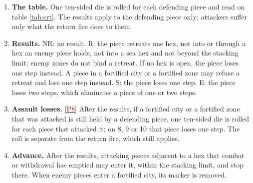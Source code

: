 \documentclass[11pt]{article}
\newcommand{\ptest}[1]{\hyperlink{ptest}{\textcolor{darkred}{[P#1]}}}
\begin{document}
\begin{enumerate}
\begin{eqnarray}
R &=& \left\lfloor A/D \right\rfloor \mbox{\quad giving odds } R{:}1, \mbox{ when } A \ge D, \label{eq:odds_A}\\
R &=& \left\lceil D/A \right\rceil \mbox{\quad giving odds } 1{:}R, \mbox{ when } A < D. \label{eq:odds_B}
\end{eqnarray}
HexKrieg rounds both ratios up from three quarters,
\begin{eqnarray}
R &=& \left\lfloor \tfrac{1}{4}+A/D \right\rfloor \mbox{\quad when } A \ge D, \label{eq:hkodds_A}\\
R &=& \left\lfloor \tfrac{1}{4}+D/A \right\rfloor \mbox{\quad when } A < D, \label{eq:hkodds_B}
\end{eqnarray}
so that by equation \eqref{eq:hkodds_B} an attack of 2 on a defense of 3 counts as 1:1; by equation \eqref{eq:odds_B} it counts as 1:2.
\item \textbf{The table.} One ten-sided die is rolled for each defending piece and read on table \ref{tab:crt}. The results apply to the defending piece only; attackers suffer only what the return fire does to them.
\item \textbf{Results.} NR: no result. R: the piece retreats one hex, not into or through a hex an enemy piece holds, not into a sea hex and not beyond the stacking limit; enemy zones do not bind a retreat. If no hex is open, the piece loses one step instead. A piece in a fortified city or a fortified zone may refuse a retreat and lose one step instead. S: the piece loses one step. E: the piece loses two steps, which eliminates a piece of one or two steps.
\item \textbf{Assault losses.} \ptest{8} After the results, if a fortified city or a fortified zone that was attacked is still held by a defending piece, one ten-sided die is rolled for each piece that attacked it; on 8, 9 or 10 that piece loses one step. The roll is separate from the return fire, which still applies.
\item \textbf{Advance.} After the results, attacking pieces adjacent to a hex that combat or withdrawal has emptied may enter it, within the stacking limit, and stop there. When enemy pieces enter a fortified city, its marker is removed.
\end{enumerate}
\end{document}
